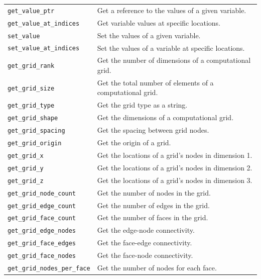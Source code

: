 \documentclass[12pt]{amsart}
\begin{document}
\begin{table}[htbp]
\begin{tabular}{ll}
        \verb|get_value_ptr| & Get a reference to the values of a given variable. \\
        \verb|get_value_at_indices| & Get variable values at specific locations. \\
        \verb|set_value| & Set the values of a given variable. \\
        \verb|set_value_at_indices| & Set the values of a variable at specific locations. \\
        \verb|get_grid_rank| & Get the number of dimensions of a computational grid. \\
        \verb|get_grid_size| & Get the total number of elements of a computational grid. \\
        \verb|get_grid_type| & Get the grid type as a string. \\
        \verb|get_grid_shape| & Get the dimensions of a computational grid. \\
        \verb|get_grid_spacing| & Get the spacing between grid nodes. \\
        \verb|get_grid_origin| & Get the origin of a grid. \\
        \verb|get_grid_x| & Get the locations of a grid’s nodes in dimension 1. \\
        \verb|get_grid_y| & Get the locations of a grid’s nodes in dimension 2. \\
        \verb|get_grid_z| & Get the locations of a grid’s nodes in dimension 3. \\
        \verb|get_grid_node_count| & Get the number of nodes in the grid. \\
        \verb|get_grid_edge_count| & Get the number of edges in the grid. \\
        \verb|get_grid_face_count| & Get the number of faces in the grid. \\
        \verb|get_grid_edge_nodes| & Get the edge-node connectivity. \\
        \verb|get_grid_face_edges| & Get the face-edge connectivity. \\
        \verb|get_grid_face_nodes| & Get the face-node connectivity. \\
        \verb|get_grid_nodes_per_face| & Get the number of nodes for each face. \\
    \hline
   \end{tabular}
   \label{tab:bmi}
\end{table}
\end{document}
